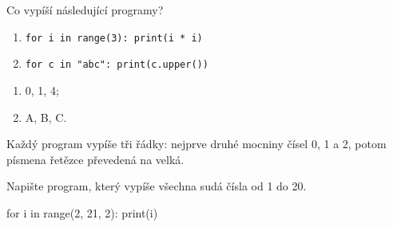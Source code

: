 \begin{task}[title=Rozbor kódu, points=3, answer=dots, lines=2]
  Co vypíší následující programy?
  \begin{enumerate}
    \item \verb|for i in range(3): print(i * i)|
    \item \verb|for c in "abc": print(c.upper())|
  \end{enumerate}

  \begin{results}
    \begin{enumerate}
      \item 0, 1, 4;
      \item A, B, C.
    \end{enumerate}
  \end{results}

  \begin{solution}
    Každý program vypíše tři řádky: nejprve druhé mocniny čísel 0, 1 a 2,
    potom písmena řetězce převedená na velká.
  \end{solution}
\end{task}

\begin{task}[points=5, stars=1, answer=box, space=5cm]
  Napište program, který vypíše všechna sudá čísla od 1 do 20.

  \begin{solution}
    \begin{code}[Python]
for i in range(2, 21, 2):
    print(i)
\end{code}
  \end{solution}
\end{task}
